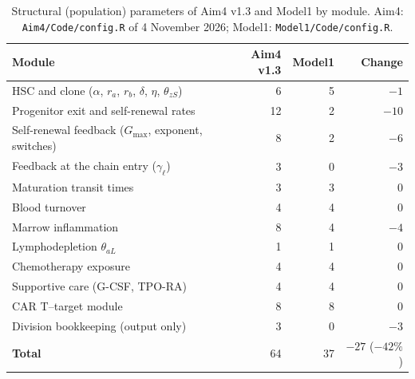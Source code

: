 \begin{table}[!htbp]
\centering
\small
\setlength{\tabcolsep}{3.5pt}
\caption{Structural (population) parameters of Aim4 v1.3 and Model1 by module. Aim4: \texttt{Aim4/Code/config.R} of 4 November 2026; Model1: \texttt{Model1/Code/config.R}.}
\label{tab:reduction}
\begin{tabular}{>{\raggedright\arraybackslash}p{7.6cm}rrr}
\toprule
Module & Aim4 v1.3 & Model1 & Change \\
\midrule
HSC and clone ($\alpha$, $r_a$, $r_b$, $\delta$, $\eta$, $\theta_{zS}$) & 6 & 5 & $-1$ \\
Progenitor exit and self-renewal rates & 12 & 2 & $-10$ \\
Self-renewal feedback ($G_{\max}$, exponent, switches) & 8 & 2 & $-6$ \\
Feedback at the chain entry ($\gamma_\ell$) & 3 & 0 & $-3$ \\
Maturation transit times & 3 & 3 & 0 \\
Blood turnover & 4 & 4 & 0 \\
Marrow inflammation & 8 & 4 & $-4$ \\
Lymphodepletion $\theta_{aL}$ & 1 & 1 & 0 \\
Chemotherapy exposure & 4 & 4 & 0 \\
Supportive care (G-CSF, TPO-RA) & 4 & 4 & 0 \\
CAR T--target module & 8 & 8 & 0 \\
Division bookkeeping (output only) & 3 & 0 & $-3$ \\
\midrule
\textbf{Total} & 64 & 37 & $-27$ ($-42\%$) \\
\bottomrule
\end{tabular}
\end{table}
